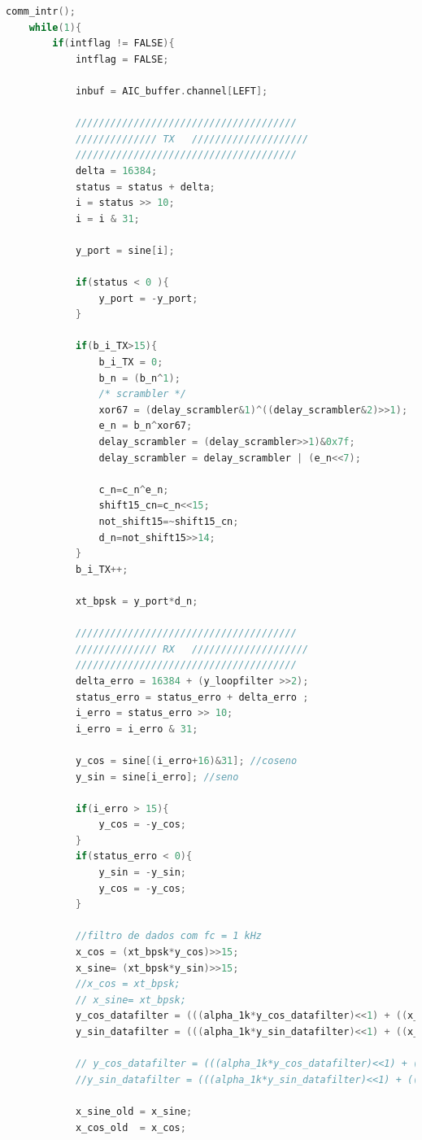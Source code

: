 \documentclass[11pt]{article}
\numberwithin{equation}{section}
\begin{document}
{\begin{lstlisting}[language=C]
	comm_intr();                   
	while(1){                	   	
		if(intflag != FALSE){
			intflag = FALSE;
			
			inbuf = AIC_buffer.channel[LEFT];
			
			//////////////////////////////////////
			////////////// TX	////////////////////
			//////////////////////////////////////
			delta = 16384;
			status = status + delta;
			i = status >> 10;
			i = i & 31;
			
			y_port = sine[i];
			
			if(status < 0 ){
				y_port = -y_port;
			}
			
			if(b_i_TX>15){
				b_i_TX = 0;
				b_n = (b_n^1);
				/* scrambler */
				xor67 = (delay_scrambler&1)^((delay_scrambler&2)>>1);
				e_n = b_n^xor67;
				delay_scrambler = (delay_scrambler>>1)&0x7f;
				delay_scrambler = delay_scrambler | (e_n<<7);
				
				c_n=c_n^e_n;
				shift15_cn=c_n<<15;
				not_shift15=~shift15_cn;
				d_n=not_shift15>>14;
			}
			b_i_TX++;
			
			xt_bpsk = y_port*d_n;
			
			//////////////////////////////////////
			////////////// RX	////////////////////
			//////////////////////////////////////	
			delta_erro = 16384 + (y_loopfilter >>2);
			status_erro = status_erro + delta_erro ;
			i_erro = status_erro >> 10;
			i_erro = i_erro & 31;
			
			y_cos = sine[(i_erro+16)&31]; //coseno
			y_sin = sine[i_erro]; //seno
			
			if(i_erro > 15){
				y_cos = -y_cos;
			}
			if(status_erro < 0){
				y_sin = -y_sin;
				y_cos = -y_cos;
			}
			
			//filtro de dados com fc = 1 kHz
			x_cos = (xt_bpsk*y_cos)>>15;
			x_sine= (xt_bpsk*y_sin)>>15;
			//x_cos = xt_bpsk;
			// x_sine= xt_bpsk;
			y_cos_datafilter = (((alpha_1k*y_cos_datafilter)<<1) + ((x_cos*um_menos_alpha_1k)<<1))>>16;/*Filtro sem zero em ws/2*/
			y_sin_datafilter = (((alpha_1k*y_sin_datafilter)<<1) + ((x_sine*um_menos_alpha_1k)<<1))>>16;/*Filtro sem zero em ws/2*/
			
			// y_cos_datafilter = (((alpha_1k*y_cos_datafilter)<<1) + ((((x_cos + x_cos_old)*um_menos_alpha_1k)>>1)<<1))>>16;/*Filtro com zero em ws/2*/
			//y_sin_datafilter = (((alpha_1k*y_sin_datafilter)<<1) + ((((x_sine + x_sine_old)*um_menos_alpha_1k)>>1)<<1))>>16;/*Filtro com zero em ws/2*/
			
			x_sine_old = x_sine;
			x_cos_old  = x_cos;
			

\end{lstlisting}}
\end{document}
